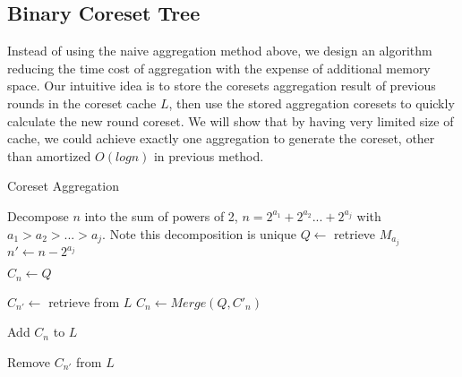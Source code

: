 \subsection{Binary Coreset Tree}
Instead of using the naive aggregation method above, we design an algorithm reducing the time cost of aggregation with the expense of additional memory space. Our intuitive idea is to store the coresets aggregation result of previous rounds in the coreset cache $L$, then use the stored aggregation coresets to quickly calculate the new round coreset. We will show that by having very limited size of cache, we could achieve exactly one aggregation to generate the coreset, other than amortized $O(logn)$ in previous method.

\begin{algorithm}
\caption{{\sf Coreset Aggregation}}
\BlankLine

Decompose $n$ into the sum of powers of 2, $ n = 2^{a_1} + 2^{a_2} ... + 2^{a_j} $ with $a_1 > a_2 > ... > a_j$. Note this decomposition is unique\;
$Q \leftarrow$ retrieve $M_{a_j}$\;
$n' \leftarrow n - 2^{a_j} $\;

 {     
	$C_n \leftarrow Q$\;
} {
	$C_{n'} \leftarrow$ retrieve from $L$\;
	$C_n \leftarrow Merge(Q, C'_n)$\;

}

 {
	Add $C_n$ to $L$\;
}

 {
	Remove $C_{n'}$ from $L$\;
}

\end{algorithm}
